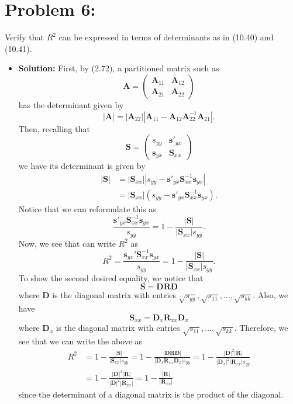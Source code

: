 \documentclass[11pt]{article}
\begin{document}
\section*{Problem 6:}
Verify that $R^2$ can be expressed in terms of determinants as in (10.40) and (10.41).
\begin{itemize}
\item[] \textbf{Solution:}  First, by (2.72), a partitioned matrix such as
\[
\mathbf{A} = \begin{pmatrix}
\mathbf{A}_{11} & \mathbf{A}_{12} \\
\mathbf{A}_{21} & \mathbf{A}_{22}
\end{pmatrix}
\]
has the determinant given by
\[
|\mathbf{A}| = |\mathbf{A}_{22}||\mathbf{A}_{11} - \mathbf{A}_{12}\mathbf{A}_{22}^{-1}\mathbf{A}_{21}|.
\]
Then, recalling that
\[
\mathbf{S} = \begin{pmatrix}
s_{yy} & \mathbf{s}'_{yx} \\
\mathbf{s}_{yx} & \mathbf{S}_{xx}
\end{pmatrix}
\]
we have its determinant is given by
\begin{align*}
|\mathbf{S}| &= |\mathbf{S}_{xx}||s_{yy} - \mathbf{s}'_{yx}\mathbf{S}_{xx}^{-1}\mathbf{s}_{yx}| \\
&= |\mathbf{S}_{xx}|(s_{yy} - \mathbf{s}'_{yx}\mathbf{S}_{xx}^{-1}\mathbf{s}_{yx}).
\end{align*}
Notice that we can reformulate this as
\[
\frac{\mathbf{s}'_{yx}\mathbf{S}_{xx}^{-1}\mathbf{s}_{yx}}{s_{yy}} = 1 - \frac{|\mathbf{S}|}{|\mathbf{S}_{xx}|s_{yy}}.
\]
Now, we see that can write $R^2$ as
\[
R^2 = \frac{\mathbf{s}_{yx}'\mathbf{S}_{xx}^{-1}\mathbf{s}_{yx}}{s_{yy}} =1 - \frac{|\mathbf{S}|}{|\mathbf{S}_{xx}|s_{yy}}.
\]
To show the second desired equality, we notice that
\[
\mathbf{S} = \mathbf{D}\mathbf{R}\mathbf{D}
\]
where $\mathbf{D}$ is the diagonal matrix with entries $\sqrt{s_{yy}},\sqrt{s_{11}},...,\sqrt{s_{kk}}$.  Also, we have
\[
\mathbf{S}_{xx} = \mathbf{D}_x\mathbf{R}_{xx}\mathbf{D}_x
\]
where $\mathbf{D}_x$ is the diagonal matrix with entries $\sqrt{s_{11}},...,\sqrt{s_{kk}}$.  Therefore, we see that we can write the above as
\begin{align*}
R^2 &= 1 - \frac{|\mathbf{S}|}{|\mathbf{S}_{xx}|s_{yy}} = 1 - \frac{|\mathbf{D}\mathbf{R}\mathbf{D}|}{|\mathbf{D}_x\mathbf{R}_{xx}\mathbf{D}_x|s_{yy}} = 1 - \frac{|\mathbf{D}|^2|\mathbf{R}|}{|\mathbf{D}_x|^2|\mathbf{R}_{xx}|s_{yy}}\\
 &=1 - \frac{|\mathbf{D}|^2|\mathbf{R}|}{|\mathbf{D}|^2|\mathbf{R}_{xx}|} = 1 - \frac{|\mathbf{R}|}{|\mathbf{R}_{xx}|}
\end{align*}
since the determinant of a diagonal matrix is the product of the diagonal.

\end{itemize}
\end{document}
